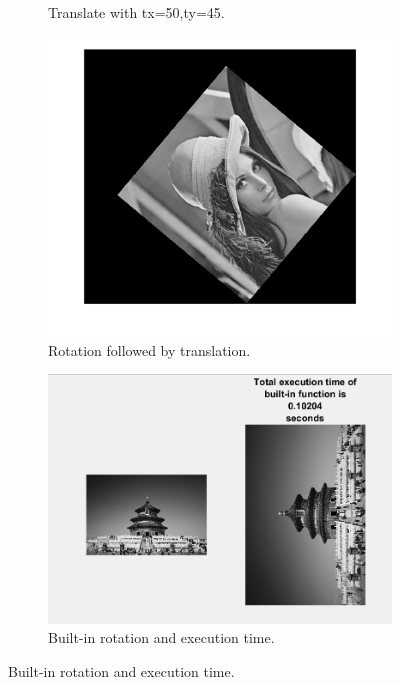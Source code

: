 \documentclass[14pt]{article}
\begin{document}
\begin{figure}[hbt!]
\begin{subfigure}[b]{0.23\linewidth}
			\caption{Translate with tx=50,ty=45.}
		\end{subfigure}
		\begin{subfigure}[b]{0.23\linewidth}
			\includegraphics[width=\linewidth]{rotAndtrans.png}
			\caption{Rotation followed by translation.}
		\end{subfigure}
		\begin{subfigure}[b]{0.92\linewidth}
			\includegraphics[width=\linewidth]{built-in-trans.png}
			\caption{Built-in rotation and execution time.}
		\end{subfigure}
	\end{figure}
\end{document}
